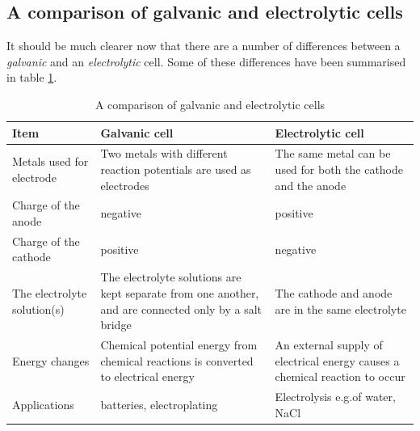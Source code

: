 \subsection{A comparison of galvanic and electrolytic cells}

It should be much clearer now that there are a number of differences between a \textit{galvanic} and an \textit{electrolytic} cell. Some of these differences have been summarised in table \ref{tab:electrochemical:comparison}.

\begin{table}[h]
\begin{center}
\begin{tabular}{|p{4cm}|p{4cm}|p{4cm}|}\hline
\textbf{Item} & \textbf{Galvanic cell} & \textbf{Electrolytic cell}\\\hline
Metals used for electrode & Two metals with different reaction potentials are used as electrodes & The same metal can be used for both the cathode and the anode \\\hline
Charge of the anode & negative & positive \\\hline
Charge of the cathode & positive & negative \\\hline
The electrolyte solution(s) & The electrolyte solutions are kept separate from one another, and are connected only by a salt bridge & The cathode and anode are in the same electrolyte \\\hline
Energy changes & Chemical potential energy from chemical reactions is converted to electrical energy & An external supply of electrical energy causes a chemical reaction to occur \\\hline
Applications & batteries, electroplating & Electrolysis e.g.\@ of water, NaCl \\\hline

\end{tabular}
\end{center}
\caption{A comparison of galvanic and electrolytic cells}
\label{tab:electrochemical:comparison}
\end{table} 

\newpage

